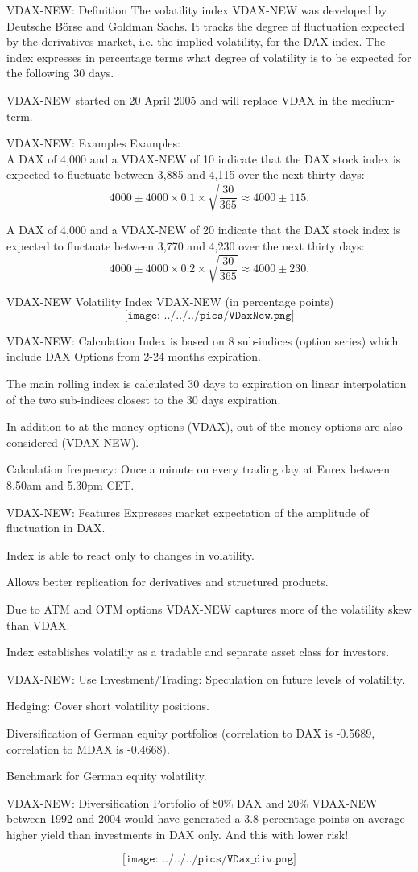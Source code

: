 VDAX-NEW: Definition
	The volatility index VDAX-NEW was developed by Deutsche B{\"o}rse and Goldman Sachs. 
	It tracks the degree of fluctuation expected by the derivatives market, i.e. the implied volatility, 
	for the DAX index. The index expresses in percentage terms what degree of volatility is to be expected 
	for the following 30 days.
  
	VDAX-NEW started on 20 April 2005 and will replace VDAX in the medium-term.


VDAX-NEW: Examples
	Examples:\\
		A DAX of 4,000 and a VDAX-NEW of 10 indicate that the DAX stock index is expected to fluctuate between 3,885 and 4,115 over the next thirty days:
		$$4000\pm4000\times0.1\times\sqrt{\frac{30}{365}}\approx4000\pm115.$$
   
		A DAX of 4,000 and a VDAX-NEW of 20 indicate that the DAX stock index is expected to fluctuate between 3,770 and 4,230 over the next thirty days:
    $$4000\pm4000\times0.2\times\sqrt{\frac{30}{365}}\approx4000\pm230.$$


VDAX-NEW
	Volatility Index VDAX-NEW (in percentage points)
	$$\texttt{[image: ../../../pics/VDaxNew.png]}$$


VDAX-NEW: Calculation
	Index is based on 8 sub-indices (option series) which include DAX Options from 2-24 months expiration.
  
	The main rolling index is calculated 30 days to expiration on linear interpolation of the two sub-indices closest to the 30 days expiration.
  
	In addition to at-the-money options (VDAX), out-of-the-money options are also considered (VDAX-NEW).
  
	Calculation frequency: Once a minute on every trading day at Eurex between 8.50am and 5.30pm CET.


VDAX-NEW: Features
	Expresses market expectation of the amplitude of fluctuation in DAX.
  
	Index is able to react only to changes in volatility.
  
	Allows better replication for derivatives and structured products.
  
	Due to ATM and OTM options VDAX-NEW captures more of the volatility skew than VDAX.
  
	Index establishes volatiliy as a tradable and separate asset class for investors.


VDAX-NEW: Use
	Investment/Trading: Speculation on future levels of volatility.
	
	Hedging: Cover short volatility positions.
  
	Diversification of German equity portfolios (correlation to DAX is -0.5689, correlation to MDAX is -0.4668).
  
	Benchmark for German equity volatility.


VDAX-NEW: Diversification
	Portfolio of 80\% DAX and 20\% VDAX-NEW between
	1992 and 2004 would have generated a 3.8 percentage
	points on average higher yield than investments in
	DAX only. And this with lower risk!

	$$\texttt{[image: ../../../pics/VDax\_div.png]}$$

